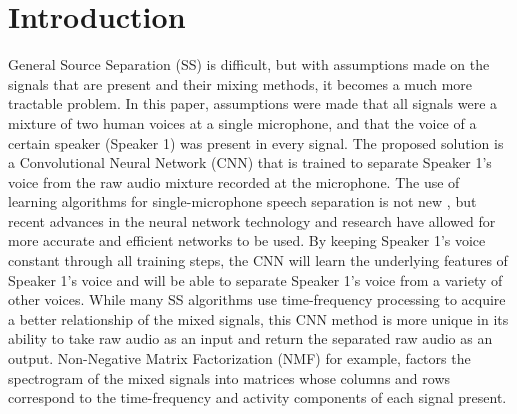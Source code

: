 \documentclass[12pt,chapterheads]{ucsd}
\begin{document}
%







%   
%   
%


\section{Introduction}
\label{sec:intro}
General Source Separation (SS) is difficult, but with assumptions made on the signals that are present and their mixing methods, it becomes a much more tractable problem. In this paper, assumptions were made that all signals were a mixture of two human voices at a single microphone, and that the voice of  a certain speaker (Speaker 1) was present in every signal. The proposed solution is a Convolutional Neural Network (CNN) that is trained to separate Speaker 1's voice from the raw audio mixture recorded at the microphone. The use of learning algorithms for single-microphone speech separation is not new \cite{roweis2001one}, but recent advances in the neural network technology and research have allowed for more accurate and efficient networks to be used. By keeping Speaker 1's voice constant through all training steps, the CNN will learn the underlying features of Speaker 1's voice and will be able to separate Speaker 1's voice from a variety of other voices. While many SS algorithms use time-frequency processing to acquire a better relationship of the mixed signals, this CNN method is more unique in its ability to take raw audio as an input and return the separated raw audio as an output. Non-Negative Matrix Factorization (NMF) for example, factors the spectrogram of the mixed signals into matrices whose columns and rows correspond to the time-frequency and activity components of each signal present.
\end{document}
